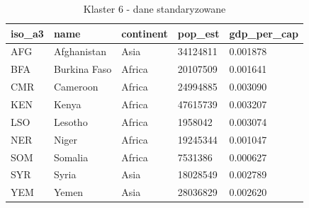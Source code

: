 \documentclass[11pt]{report}
\begin{document}
    \begin{table}[h!]
        \caption {Klaster 6 - dane standaryzowane} \label{tab:cl6std}
        \begin{tabular}{lllll}
            \hline
            \multicolumn{1}{|l|}{iso\_a3} & \multicolumn{1}{l|}{name} & \multicolumn{1}{l|}{continent} & \multicolumn{1}{l|}{pop\_est} & \multicolumn{1}{l|}{gdp\_per\_cap} \\ \hline
            AFG                           & Afghanistan               & Asia                           & 34124811                      & 0.001878                           \\
            BFA                           & Burkina Faso              & Africa                         & 20107509                      & 0.001641                           \\
            CMR                           & Cameroon                  & Africa                         & 24994885                      & 0.003090                           \\
            KEN                           & Kenya                     & Africa                         & 47615739                      & 0.003207                           \\
            LSO                           & Lesotho                   & Africa                         & 1958042                       & 0.003074                           \\
            NER                           & Niger                     & Africa                         & 19245344                      & 0.001047                           \\
            SOM                           & Somalia                   & Africa                         & 7531386                       & 0.000627                           \\
            SYR                           & Syria                     & Asia                           & 18028549                      & 0.002789                           \\
            YEM                           & Yemen                     & Asia                           & 28036829                      & 0.002620
        \end{tabular}
    \end{table}
\end{document}
